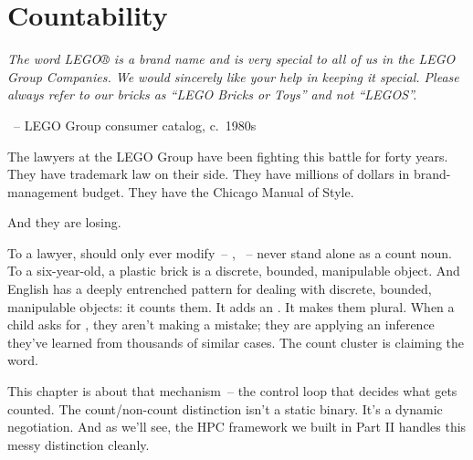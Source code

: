 \chapter{Countability}
\label{ch:countability}


\epigraph{\textit{The word LEGO® is a brand name and is very special to all of us in the LEGO Group Companies. We would sincerely like your help in keeping it special. Please always refer to our bricks as \enquote{LEGO Bricks or Toys} and not \enquote{LEGOS}.}}{~-- LEGO Group consumer catalog, c.~1980s}

The lawyers at the LEGO Group have been fighting this battle for forty years. They have trademark law on their side. They have millions of dollars in brand-management budget. They have the Chicago Manual of Style.

And they are losing.

To a lawyer,  should only ever modify~-- , ~-- never stand alone as a count noun. To a six-year-old, a plastic brick is a discrete, bounded, manipulable object. And English has a deeply entrenched pattern for dealing with discrete, bounded, manipulable objects: it counts them. It adds an . It makes them plural. When a child asks for , they aren't making a mistake; they are applying an inference they've learned from thousands of similar cases. The count cluster is claiming the word.

This chapter is about that mechanism~-- the control loop that decides what gets counted. The count/non-count distinction isn't a static binary. It's a dynamic negotiation. And as we'll see, the HPC framework we built in Part II handles this messy distinction cleanly.

